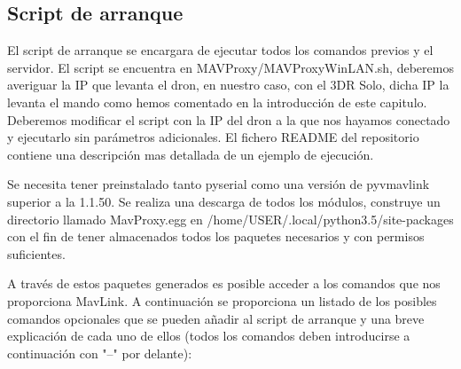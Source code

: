 \subsection{Script de arranque}
\label{Script de arranque}

El script de arranque se encargara de ejecutar todos los comandos previos y el servidor. El script se encuentra en MAVProxy/MAVProxyWinLAN.sh, deberemos averiguar la IP que levanta el dron, en nuestro caso, con el 3DR Solo, dicha IP la levanta el mando como hemos comentado en la introducción de este capitulo. Deberemos modificar el script con la IP del dron a la que nos hayamos conectado y ejecutarlo sin parámetros adicionales. El fichero README del repositorio contiene una descripción mas detallada de un ejemplo de ejecución.

Se necesita tener preinstalado tanto pyserial como una versión de pyvmavlink superior a la 1.1.50. Se realiza una descarga de todos los módulos, construye un directorio llamado MavProxy.egg en /home/USER/.local/python3.5/site-packages con el fin de tener almacenados todos los paquetes necesarios y con permisos suficientes. 

A través de estos paquetes generados es posible acceder a los comandos que nos proporciona MavLink. A continuación se proporciona un listado de los posibles comandos opcionales que se pueden añadir al script de arranque y una breve explicación de cada uno de ellos (todos los comandos deben introducirse a continuación con "--" por delante):

